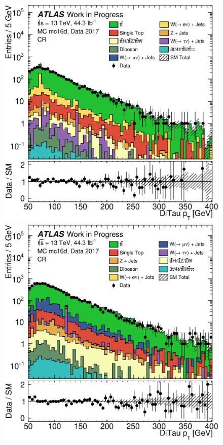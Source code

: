 \begin{figure}[th!]
    \includegraphics[width=\individualPlotWidth]{Assets/Plots/withTF/e-channel/h_stack_mc16d_data17_ditau_pt.eps}
    \hspace{1em}
    \includegraphics[width=\individualPlotWidth]{Assets/Plots/withTF/mu-channel/h_stack_mc16d_data17_ditau_pt.eps}


\end{figure}
